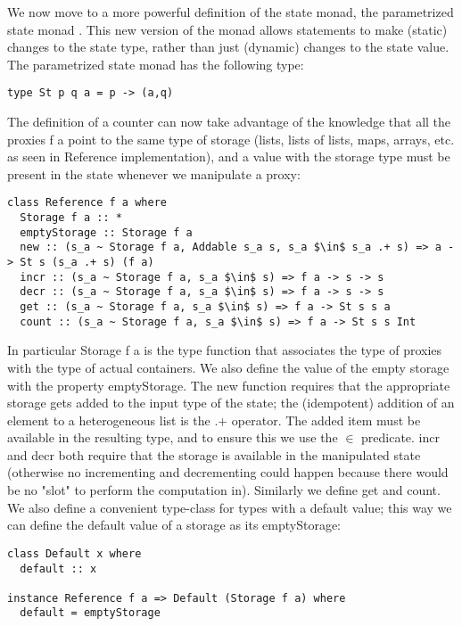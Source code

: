 We now move to a more powerful definition of the state monad, the parametrized state monad \cite{1_7}. This new version of the monad allows statements to make (static) changes to the state type, rather than just (dynamic) changes to the state value. The parametrized state monad has the following type:

\begin{lstlisting}
type St p q a = p -> (a,q)
\end{lstlisting}

The definition of a counter can now take advantage of the knowledge that all the proxies f a point to the same type of storage (lists, lists of lists, maps, arrays, etc. as seen in Reference implementation), and a value with the storage type must be present in the state whenever we manipulate a proxy:

\begin{lstlisting}
class Reference f a where
  Storage f a :: *
  emptyStorage :: Storage f a
  new :: (s_a ~ Storage f a, Addable s_a s, s_a $\in$ s_a .+ s) => a -> St s (s_a .+ s) (f a)
  incr :: (s_a ~ Storage f a, s_a $\in$ s) => f a -> s -> s
  decr :: (s_a ~ Storage f a, s_a $\in$ s) => f a -> s -> s
  get :: (s_a ~ Storage f a, s_a $\in$ s) => f a -> St s s a
  count :: (s_a ~ Storage f a, s_a $\in$ s) => f a -> St s s Int
\end{lstlisting}

In particular Storage f a is the type function that associates the type of proxies with the type of actual containers. We also define the value of the empty storage with the property emptyStorage. The new function requires that the appropriate storage gets added to the input type of the state; the (idempotent) addition of an element to a heterogeneous list \cite{4_1,4_2} is the .+ operator. The added item must be available in the resulting type, and to ensure this we use the $\in$ predicate. incr and decr both require that the storage is available in the manipulated state (otherwise no incrementing and decrementing could happen because there would be no "slot" to perform the computation in). Similarly we define get and count.
We also define a convenient type-class for types with a default value; this way we can define the default value of a storage as its emptyStorage:

\begin{lstlisting}
class Default x where
  default :: x

instance Reference f a => Default (Storage f a) where
  default = emptyStorage
\end{lstlisting}

